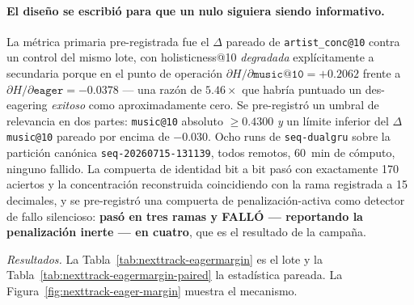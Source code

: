 \documentclass[11pt]{article}
\newcommand{\dsid}[1]{\texttt{\small #1}}
\begin{document}
\paragraph{El diseño se escribió para que un nulo siguiera siendo informativo.} La
métrica primaria pre-registrada fue el $\Delta$ pareado de
\texttt{artist\_conc@10} contra un control del mismo lote, con holisticness@10
\emph{degradada} explícitamente a secundaria porque en el punto de operación
$\partial H/\partial\texttt{music@10} = +\num{0.2062}$ frente a
$\partial H/\partial\texttt{eager} = -\num{0.0378}$ --- una razón de
$\num{5.46}\times$ que habría puntuado un des-eagering \emph{exitoso} como
aproximadamente cero. Se pre-registró un umbral de relevancia en dos partes:
\texttt{music@10} absoluto $\ge\num{0.4300}$ \emph{y} un límite inferior del
$\Delta$\texttt{music@10} pareado por encima de $-\num{0.030}$. Ocho runs de
\texttt{seq-dualgru} sobre la partición canónica \dsid{seq-20260715-131139}, todos
remotos, \SI{60}{\minute} de cómputo, ninguno fallido. La compuerta de identidad
bit a bit pasó con exactamente \num{170} aciertos y la concentración reconstruida
coincidiendo con la rama registrada a \num{15} decimales, y se pre-registró una
compuerta de penalización-activa como detector de fallo silencioso: \textbf{pasó en
tres ramas y FALLÓ --- reportando la penalización inerte --- en cuatro}, que es el
resultado de la campaña.

\emph{Resultados.} La Tabla~\ref{tab:nexttrack-eagermargin} es el lote y la
Tabla~\ref{tab:nexttrack-eagermargin-paired} la estadística pareada. La
Figura~\ref{fig:nexttrack-eager-margin} muestra el mecanismo.
\end{document}
